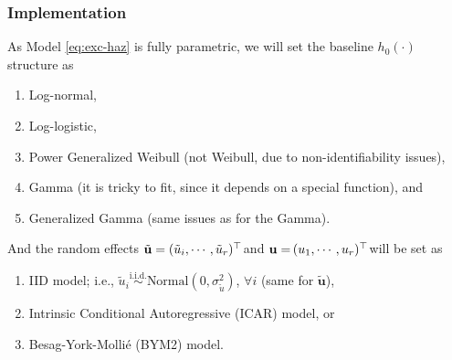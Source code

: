 \documentclass[10pt, aspectratio = 169, handout]{beamer} %
\begin{document}
    \begin{frame}[t]
		\frametitle{Implementation}
		\justifying
		As \textcolor{titles}{Model \eqref{eq:exc-haz}} is fully parametric, we will set the baseline $h_0(\cdot)$ structure as\vspace{-6pt}
		\begin{enumerate}
			\item Log-normal,
			\item Log-logistic,
			\item Power \hspace{-1pt}Generalized \hspace{-1pt}Weibull \hspace{-1pt}(not \hspace{-1pt}Weibull, due to \hspace{-1pt}non-identifiability \hspace{-1pt}issues),
			\item Gamma (it is tricky to fit, since it depends on a special function), and
			\item Generalized Gamma (same issues as for the Gamma).
		\end{enumerate}

        \pause
			
		And the random effects $\tilde{\mathbf{u}} = (\tilde{u}_i, \cdots, \tilde{u}_r)^{\top}\hspace{-3pt}$ and $\mathbf{u} = \hspace{-1pt}(u_1, \cdots, u_r)^{\top}\hspace{-3pt}$ will be set as
		\begin{enumerate}
			\item IID model; i.e., $\tilde{u}_i \overset{\text{i.i.d.}}{\sim}\text{Normal}(0, \sigma_{\tilde{u}}^2)$, $\forall i$ (same for $\tilde{\mathbf{u}}$),
			\item Intrinsic Conditional Autoregressive (ICAR) model, or
			\item Besag-York-Mollié (BYM2) model.
		\end{enumerate}
		
	\end{frame}
	
\end{document}
